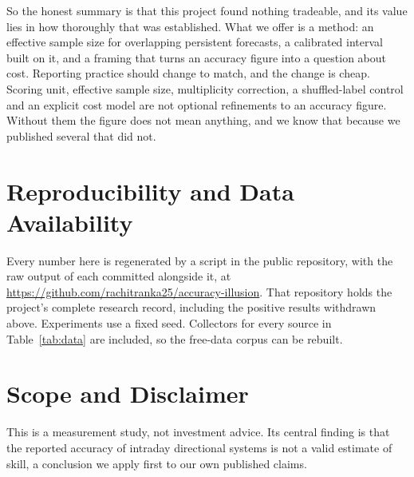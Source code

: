 \documentclass[conference]{IEEEtran}
\begin{document}
So the honest summary is that this project found nothing tradeable, and its
value lies in how thoroughly that was established. What we offer is a method: an
effective sample size for overlapping persistent forecasts, a calibrated
interval built on it, and a framing that turns an accuracy figure into a
question about cost. Reporting practice should change to match, and the change
is cheap. Scoring unit, effective sample size, multiplicity correction, a
shuffled-label control and an explicit cost model are not optional refinements
to an accuracy figure. Without them the figure does not mean anything, and we
know that because we published several that did not.


\section*{Reproducibility and Data Availability}

Every number here is regenerated by a script in the public repository, with the
raw output of each committed alongside it, at
\url{https://github.com/rachitranka25/accuracy-illusion}. That repository holds
the project's complete research record, including the positive results withdrawn
above. Experiments use a fixed seed. Collectors for every source in
Table~\ref{tab:data} are included, so the free-data corpus can be rebuilt.

\section*{Scope and Disclaimer}

This is a measurement study, not investment advice. Its central finding is that
the reported accuracy of intraday directional systems is not a valid estimate of
skill, a conclusion we apply first to our own published claims.
\end{document}
